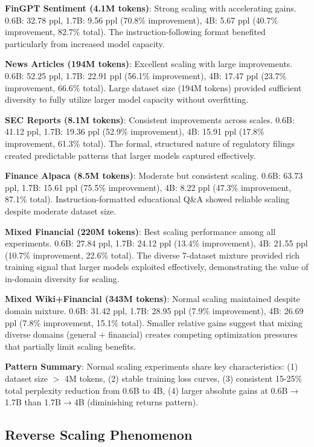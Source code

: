 \textbf{FinGPT Sentiment (4.1M tokens)}: Strong scaling with accelerating gains. 0.6B: 32.78 ppl, 1.7B: 9.56 ppl (70.8\% improvement), 4B: 5.67 ppl (40.7\% improvement, 82.7\% total). The instruction-following format benefited particularly from increased model capacity.

\textbf{News Articles (194M tokens)}: Excellent scaling with large improvements. 0.6B: 52.25 ppl, 1.7B: 22.91 ppl (56.1\% improvement), 4B: 17.47 ppl (23.7\% improvement, 66.6\% total). Large dataset size (194M tokens) provided sufficient diversity to fully utilize larger model capacity without overfitting.

\textbf{SEC Reports (8.1M tokens)}: Consistent improvements across scales. 0.6B: 41.12 ppl, 1.7B: 19.36 ppl (52.9\% improvement), 4B: 15.91 ppl (17.8\% improvement, 61.3\% total). The formal, structured nature of regulatory filings created predictable patterns that larger models captured effectively.

\textbf{Finance Alpaca (8.5M tokens)}: Moderate but consistent scaling. 0.6B: 63.73 ppl, 1.7B: 15.61 ppl (75.5\% improvement), 4B: 8.22 ppl (47.3\% improvement, 87.1\% total). Instruction-formatted educational Q\&A showed reliable scaling despite moderate dataset size.

\textbf{Mixed Financial (220M tokens)}: Best scaling performance among all experiments. 0.6B: 27.84 ppl, 1.7B: 24.12 ppl (13.4\% improvement), 4B: 21.55 ppl (10.7\% improvement, 22.6\% total). The diverse 7-dataset mixture provided rich training signal that larger models exploited effectively, demonstrating the value of in-domain diversity for scaling.

\textbf{Mixed Wiki+Financial (343M tokens)}: Normal scaling maintained despite domain mixture. 0.6B: 31.42 ppl, 1.7B: 28.95 ppl (7.9\% improvement), 4B: 26.69 ppl (7.8\% improvement, 15.1\% total). Smaller relative gains suggest that mixing diverse domains (general + financial) creates competing optimization pressures that partially limit scaling benefits.

\textbf{Pattern Summary}: Normal scaling experiments share key characteristics: (1) dataset size $>$ 4M tokens, (2) stable training loss curves, (3) consistent 15-25\% total perplexity reduction from 0.6B to 4B, (4) larger absolute gains at 0.6B$\to$1.7B than 1.7B$\to$4B (diminishing returns pattern).

\subsection{Reverse Scaling Phenomenon}

